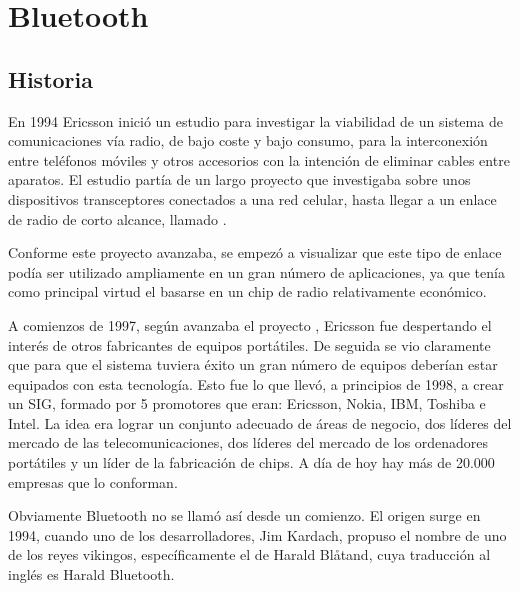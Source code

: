 
%	

\section{Bluetooth}
\label{sec:Bluetooth}


\subsection{Historia}

	En 1994 Ericsson inició un estudio para investigar la viabilidad de un sistema de comunicaciones vía radio, de bajo coste y bajo consumo, para la interconexión entre teléfonos móviles y otros accesorios con la intención de eliminar cables entre aparatos. El estudio partía de un largo proyecto que investigaba sobre unos dispositivos transceptores conectados a una red celular, hasta llegar a un enlace de radio de corto alcance, llamado .

	Conforme este proyecto avanzaba, se empezó a visualizar que este tipo de enlace podía ser utilizado ampliamente en un gran número de aplicaciones, ya que tenía como principal virtud el basarse en un chip de radio relativamente económico. 
 
	A comienzos de 1997, según avanzaba el proyecto , Ericsson fue despertando el interés de otros fabricantes de equipos portátiles. De seguida se vio claramente que para que el sistema tuviera éxito un gran número de equipos deberían estar equipados con esta tecnología. Esto fue lo que llevó, a principios de 1998, a crear un \ac{SIG}, formado por 5 promotores que eran: Ericsson, Nokia, IBM, Toshiba e Intel. La idea era lograr un conjunto adecuado de áreas de negocio, dos líderes del mercado de las telecomunicaciones, dos líderes del mercado de los ordenadores portátiles y un líder de la fabricación de chips. A día de hoy hay más de 20.000 empresas que lo conforman.

	Obviamente Bluetooth no se llamó así desde un comienzo. El origen surge en 1994, cuando uno de los desarrolladores, Jim Kardach, propuso el nombre de uno de los reyes vikingos, específicamente el de Harald Blåtand, cuya traducción al inglés es Harald Bluetooth.
	
